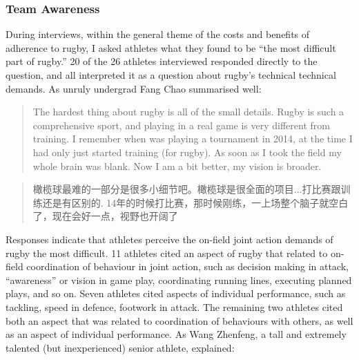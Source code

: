 \begin{CJK}{UTF8}{gbsn}

\subsubsection{Team Awareness}
During interviews, within the general theme of the costs and benefits of adherence to rugby, I asked athletes what they found to be ``the most difficult part of rugby.''  20 of the 26 athletes interviewed responded directly to the question, and all interpreted it as a question about rugby's technical technical demands.  As unruly undergrad Fang Chao summarised well:

\begin{quotation}
  The hardest thing about rugby is all of the small details. Rugby is such a comprehensive sport, and playing in a real game is very different from training. I remember when was playing a tournament in 2014, at the time I had only just started training (for rugby).  As soon as I took the field my whole brain was blank.  Now I am a bit better, my vision is broader.
\end{quotation}

\begin{quotation}
  橄榄球最难的一部分是很多小细节吧。橄榄球是很全面的项目...打比赛跟训练还是有区别的. 14年的时候打比赛，那时候刚练，一上场整个脑子就空白了，现在会好一点，视野也开阔了
\end{quotation}

Responses indicate that athletes perceive the on-field joint action demands of rugby the most difficult. 11 athletes cited an aspect of rugby that related to on-field coordination of behaviour in joint action, such as decision making in attack, ``awareness'' or vision in game play, coordinating running lines, executing planned plays, and so on.  Seven athletes cited aspects of individual performance, such as tackling, speed in defence, footwork in attack. The remaining two athletes cited both an aspect that was related to coordination of behaviours with others, as well as an aspect of individual performance.
As Wang Zhenfeng, a tall and extremely talented (but inexperienced) senior athlete, explained:


\end{CJK}
